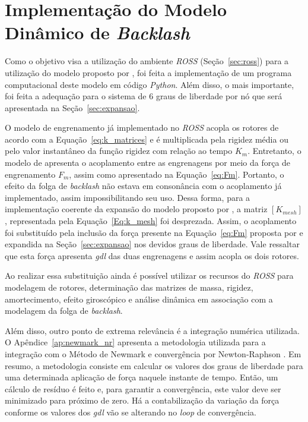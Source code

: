 \section{Implementação do Modelo Dinâmico de \textit{Backlash}}

Como o objetivo visa a utilização do ambiente \textit{ROSS} (Seção~\ref{sec:ross}) para a utilização do modelo proposto por , foi feita a implementação de um programa computacional deste modelo em código \textit{Python}. Além disso, o mais importante, foi feita a adequação para o sistema de 6 graus de liberdade por nó que será apresentada na Seção~\ref{sec:expansao}.

O modelo de engrenamento já implementado no \textit{ROSS} acopla os rotores de acordo com a Equação~\ref{eq:k_matrices} e é multiplicada pela rigidez média ou pelo valor instantâneo da função rigidez com relação ao tempo $K_m$. Entretanto, o modelo de  apresenta o acoplamento entre as engrenagens por meio da força de engrenamento $F_m$, assim como apresentado na Equação~\ref{eq:Fm}. Portanto, o efeito da folga de \textit{backlash} não estava em consonância com o acoplamento já implementado, assim impossibilitando seu uso. Dessa forma, para a implementação coerente da expansão do modelo proposto por , a matriz $[K_{mesh}]$, representada pela Equação~\ref{Eq:k_mesh} foi desprezada. Assim, o acoplamento foi substituído pela inclusão da força presente na Equação~\ref{eq:Fm} proposta por  e expandida na Seção~\ref{sec:expansao} nos devidos graus de liberdade. Vale ressaltar que esta força apresenta \textit{gdl} das duas engrenagens e assim acopla os dois rotores.

Ao realizar essa substituição ainda é possível utilizar os recursos do \textit{ROSS} para modelagem de rotores, determinação das matrizes de massa, rigidez, amortecimento, efeito giroscópico e análise dinâmica em associação com a modelagem da folga de \textit{backlash}.

Além disso, outro ponto de extrema relevância é a integração numérica utilizada. O Apêndice~\ref{ap:newmark_nr} apresenta a metodologia utilizada para a integração com o Método de Newmark e convergência por Newton-Raphson \cite{newmark}. Em resumo, a metodologia consiste em calcular  os valores dos graus de liberdade para uma determinada aplicação de força naquele  instante de tempo. Então, um cálculo de resíduo é feito e, para garantir a convergência, este valor deve ser minimizado para próximo de zero. Há a contabilização da variação da força conforme os valores dos \textit{gdl} vão se alterando no \textit{loop} de convergência. 

